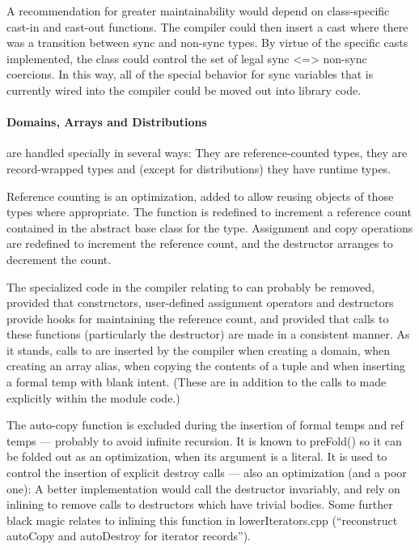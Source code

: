 A recommendation for greater maintainability would depend on class-specific
cast-in and cast-out functions.  The compiler could then insert a cast where
there was a transition between sync and non-sync types.  By virtue of the
specific casts implemented, the class could control the set of legal sync <=>
non-sync coercions.  In this way, all of the special behavior for sync variables
that is currently wired into the compiler could be moved out into library code.

\paragraph{Domains, Arrays and Distributions}
are handled specially in several ways: They
are reference-counted types, they are record-wrapped types and (except for
distributions) they have runtime types.

Reference counting is an optimization, added to allow reusing objects of those
types where appropriate.  The function  is redefined to increment
a reference count contained in the abstract base class for the type.  Assignment
and copy operations are redefined to increment the reference count, and the
destructor arranges to decrement the count.  

The specialized code in the compiler relating to  can probably be
removed, provided that constructors, user-defined assignment operators and destructors
provide hooks for maintaining the reference count, and provided that calls to
these functions (particularly the destructor) are made in a consistent manner.
As it stands, calls to  are inserted by the compiler when
creating a domain, when creating an array alias, when copying the contents of a
tuple and when inserting a formal temp with blank intent.  (These are in
addition to the calls to  made explicitly within the module
code.)

The auto-copy function is excluded during the insertion of formal temps and ref
temps --- probably to avoid infinite recursion.  It is known to preFold() so it
can be folded out as an optimization, when its argument is a literal.  It is
used to control the insertion of explicit destroy calls --- also an optimization
(and a poor one): A better implementation would call the destructor invariably,
and rely on inlining to remove calls to destructors which have trivial bodies.
Some further black magic relates to inlining this function in lowerIterators.cpp
(``reconstruct autoCopy and autoDestroy for iterator records'').

